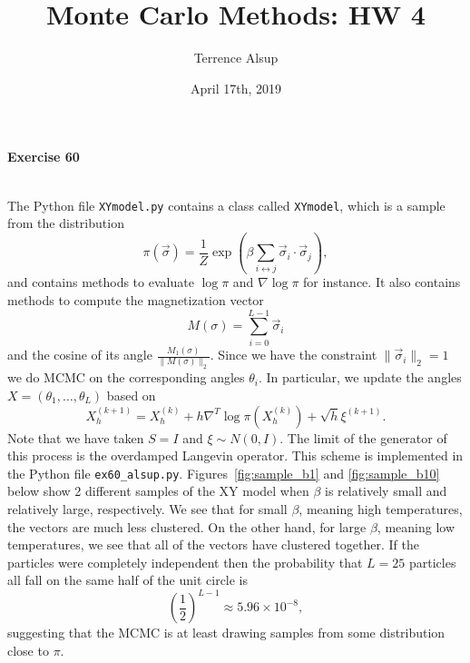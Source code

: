 \documentclass[11pt,a4paper]{amsart}
\begin{document}
\title{Monte Carlo Methods: HW 4}
\author{Terrence Alsup}
\date{April 17th, 2019}
\maketitle




{\bf Exercise 60}\\
\\
\par The Python file {\tt XYmodel.py} contains a class called {\tt XYmodel}, which is a sample from the distribution
\[
\pi(\vec{\sigma}) = \frac{1}{Z} \exp\left(\beta \sum_{i \leftrightarrow j} \vec{\sigma}_i \cdot \vec{\sigma}_j \right),
\]
and contains methods to evaluate $\log \pi$ and $\nabla \log \pi$ for instance.  It also contains methods to compute the magnetization vector
\[
M(\sigma) = \sum_{i=0}^{L-1} \vec{\sigma}_i
\]
and the cosine of its angle $\frac{M_1(\sigma)}{\|M(\sigma)\|_2}$.  Since we have the constraint $\|\vec{\sigma}_i\|_2 = 1$ we do MCMC on the corresponding angles $\theta_i$.  In particular, we update the angles $X = (\theta_1,\ldots,\theta_L)$ based on
\[
X_h^{(k+1)} = X_h^{(k)} + h\nabla^T\log \pi(X_h^{(k)}) + \sqrt{h} \xi^{(k+1)}.
\]
Note that we have taken $S = I$ and $\xi \sim N(0, I)$.  The limit of the generator of this process is the overdamped Langevin operator.  This scheme is implemented in the Python file {\tt ex60\_alsup.py}.  Figures~\ref{fig:sample_b1} and \ref{fig:sample_b10} below show 2 different samples of the XY model when $\beta$ is relatively small and relatively large, respectively.  We see that for small $\beta$, meaning high temperatures, the vectors are much less clustered.  On the other hand, for large $\beta$, meaning low temperatures, we see that all of the vectors have clustered together.  If the particles were completely independent then the probability that $L=25$ particles all fall on the same half of the unit circle is
\[
\left( \frac{1}{2} \right)^{L-1} \approx 5.96 \times 10^{-8},
\]
suggesting that the MCMC is at least drawing samples from some distribution close to $\pi$.\\
\end{document}
